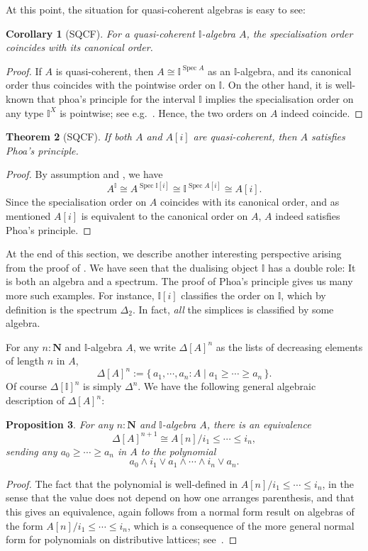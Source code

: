 \documentclass[12pt]{amsart}
\newtheorem{theorem}{Theorem}[section]
\newtheorem{corollary}[theorem]{Corollary}
\newtheorem{proposition}[theorem]{Proposition}
\theoremstyle{definition}
\newcommand{\mb}[1]{\mathbf{#1}}
\newcommand{\mbb}[1]{\mathbb{#1}}
\newcommand{\I}{\mbb I}
\newcommand{\scomp}[2]{\{\,#1\mid#2\,\}}
\newcommand{\N}{\mb N}
\newcommand{\spec}{\operatorname{Spec}}
\begin{document}
At this point, the situation for quasi-coherent algebras is easy to see:

\begin{corollary}[SQCF]
  For a quasi-coherent $\I$-algebra $A$, the specialisation order coincides with its canonical order.
\end{corollary}
\begin{proof}
  If $A$ is quasi-coherent, then $A \cong \I^{\spec A}$ as an $\I$-algebra, and its canonical order thus coincides with the pointwise order on $\I$. On the other hand, it is well-known that phoa's principle for the interval $\I$ implies the specialisation order on any type $\I^X$ is pointwise; see e.g.~\cite[Thm. 4.2.1]{hyland1990first}. Hence, the two orders on $A$ indeed coincide.
\end{proof}

\begin{theorem}[SQCF]\label{thm:algebraphoa}
  If both $A$ and $A[i]$ are quasi-coherent, then $A$ satisfies Phoa's principle.
\end{theorem}
\begin{proof}
  By assumption and , we have
  \[ A^\I \cong A^{\spec \I[i]} \cong \I^{\spec A[i]} \cong A[i]. \]
  Since the specialisation order on $A$ coincides with its canonical order, and as mentioned $A[i]$ is equivalent to the canonical order on $A$, $A$ indeed satisfies Phoa's principle.
\end{proof}

At the end of this section, we describe another interesting perspective arising from the proof of . We have seen that the dualising object $\I$ has a double role: It is both an algebra and a spectrum. The proof of Phoa's principle gives us many more such examples. For instance, $\I[i]$ classifies the order on $\I$, which by definition is the spectrum $\Delta_2$. In fact, \emph{all} the simplices is classified by some algebra.

For any $n : \N$ and $\I$-algebra $A$, we write $\Delta[A]^{n}$ as the lists of decreasing elements of length $n$ in $A$,
\[ \Delta[A]^{n} := \scomp{a_1,\cdots,a_n : A}{a_1 \ge \cdots \ge a_n}. \]
Of course $\Delta[\I]^n$ is simply $\Delta^n$. We have the following general algebraic description of $\Delta[A]^n$:

\begin{proposition}\label{prop:simplicesasalgebra}
  For any $n : \N$ and $\I$-algebra $A$, there is an equivalence 
  \[ \Delta[A]^{n+1} \cong A[n]/i_1 \le \cdots \le i_n, \]
  sending any $a_0 \ge \cdots \ge a_n$ in $A$ to the polynomial 
  \[ a_0 \wedge i_1 \vee a_1 \wedge \cdots \wedge i_n \vee a_n. \]
\end{proposition}
\begin{proof}
  The fact that the polynomial is well-defined in $A[n]/i_1 \le \cdots \le i_n$, in the sense that the value does not depend on how one arranges parenthesis, and that this gives an equivalence, again follows from a normal form result on algebras of the form $A[n]/i_1 \le \cdots \le i_n$, which is a consequence of the more general normal form for polynomials on distributive lattices; see~\cite[Thm. 10.21]{lausch2000algebra}.
\end{proof}
\end{document}
